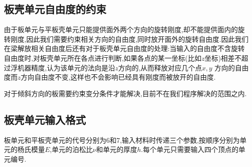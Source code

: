 \subsection{板壳单元自由度的约束}
由于板单元与平板壳单元只能提供面外两个方向的旋转刚度,却不能提供面内的旋转刚度,因此我们需要约束相关方向的自由度,同时放开面外的旋转自由度.因此我们在梁解放相关自由度后还有对于板壳单元自由度的处理:当输入的自由度不含旋转自由度时,对板壳单元所在各点进行判断,如果各点的某一坐标(比如$z$坐标)相差不超过浮机器精度,认为该单元的法向是沿$z$方向的,从而释放对应几个点$x,y$ 方向的自由度而$z$方向自由度不变,这样也不会影响已经具有刚度而被放开的自由度.

对于倾斜方向的板需要约束变分条件才能解决,目前不在我们程序解决的范围之内.

\subsection{板壳单元输入格式}
板单元和平板壳单元的代号分别为6和7,输入材料时传递三个参数,按顺序分别为单元的杨氏模量$E$,单元的泊松比$\nu$和单元的厚度$h$.每个单元只需要输入四个顶点的单元编号.

